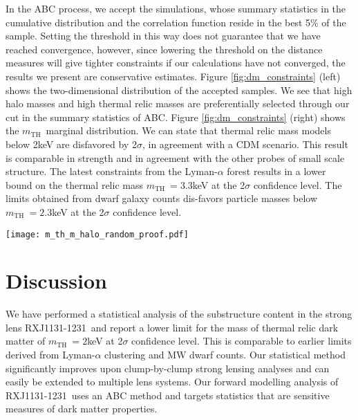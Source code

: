 \documentclass[a4paper,11pt]{article}
\def \RXJ {RXJ1131-1231~}
\def \mkeV {2}
\def \mth {\ensuremath{m_{\text{TH}}}~}
\begin{document}
In the ABC process, we accept the simulations, whose summary statistics in the cumulative distribution and the correlation function reside in the best 5\% of the sample. Setting the threshold in this way does not guarantee that we have reached convergence, however, since lowering the threshold on the distance measures will give tighter constraints if our calculations have not converged, the results we present are conservative estimates. Figure \ref{fig:dm_constraints} (left) shows the two-dimensional distribution of the accepted samples. We see that high halo masses and high thermal relic masses are preferentially selected through our cut in the summary statistics of ABC. Figure \ref{fig:dm_constraints} (right) shows the \mth marginal distribution. We can state that thermal relic mass models below \mkeV keV are disfavored by 2$\sigma$, in agreement with a CDM scenario. This result is comparable in strength and in agreement with the other probes of small scale structure. The latest constraints from the Lyman-$\alpha$ forest \citep[][]{Viel:2013p13930} results in a lower bound on the thermal relic mass $\mth = 3.3$keV at the 2$\sigma$ confidence level. The limits obtained from dwarf galaxy counts dis-favors particle masses below $\mth = 2.3$keV at the 2$\sigma$ confidence level\citep[][]{Polisensky:2011p14007, Kennedy:2014p14040}.


\begin{figure*}
  \centering
  \texttt{[image: m\_th\_m\_halo\_random\_proof.pdf]}
  \caption{\textbf{Left:} 1-$\sigma$ (dark region) and 2-$\sigma$ (light region) posterior distribution estimated by ABC method on the thermal relic mass vs halo mass plane from the lens \RXJ. \textbf{Right:} The 1-d marginals of the same distribution for the thermal relic mass. The shadowed area indicates the 2-$\sigma$ exclusion region in \mth. The sample number is limited and the details in the posterior distribution is not fully converged.}
  \label{fig:dm_constraints}
\end{figure*}



\section{Discussion} \label{sec:discussion_substr}

We have performed a statistical analysis of the substructure content in the strong lens \RXJ and report a lower limit for the mass of thermal relic dark matter of $\mth = \mkeV$keV at 2$\sigma$ confidence level. This is comparable to earlier limits derived from Lyman-$\alpha$ clustering and MW dwarf counts. Our statistical method significantly improves upon clump-by-clump strong lensing analyses and can easily be extended to multiple lens systems. Our forward modelling analysis of \RXJ uses an ABC method and targets statistics that are sensitive measures of dark matter properties.
\end{document}
